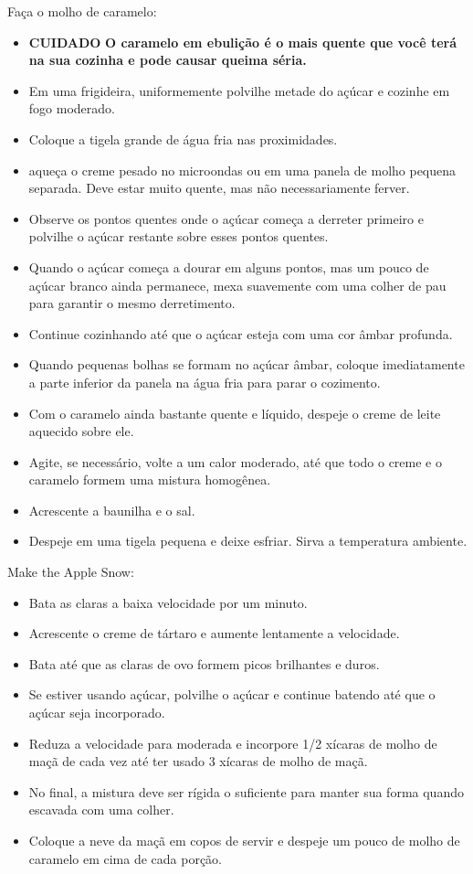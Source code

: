 \documentclass [11pt, letterpaper] {article}
\begin{document}
\begin {description}
\begin {description}
\item [Faça o molho de caramelo:] \ \\
\begin {itemize}
\item [{\bf CUIDADO}] {\bf O caramelo em ebulição é o mais quente que você terá na sua cozinha e pode causar queima séria.}
\item Em uma frigideira, uniformemente polvilhe metade do açúcar e cozinhe em fogo moderado.
\item Coloque a tigela grande de água fria nas proximidades.
\item aqueça o creme pesado no microondas ou em uma panela de molho pequena separada. Deve estar muito quente, mas não necessariamente ferver.
\item Observe os pontos quentes onde o açúcar começa a derreter primeiro e polvilhe o açúcar restante sobre esses pontos quentes.
\item Quando o açúcar começa a dourar em alguns pontos, mas um pouco de açúcar branco ainda permanece, mexa suavemente com uma colher de pau para garantir o mesmo derretimento.
\item Continue cozinhando até que o açúcar esteja com uma cor âmbar profunda.
\item Quando pequenas bolhas se formam no açúcar âmbar, coloque imediatamente a parte inferior da panela na água fria para parar o cozimento.
\item Com o caramelo ainda bastante quente e líquido, despeje o creme de leite aquecido sobre ele.
\item Agite, se necessário, volte a um calor moderado, até que todo o creme e o caramelo formem  uma mistura homogênea.
\item Acrescente a baunilha e o sal.
\item Despeje em uma tigela pequena e deixe esfriar. Sirva a temperatura ambiente.
\end {itemize}
\item [Make the Apple Snow:] \ \\
\begin {itemize}
\item Bata as claras a baixa velocidade por um minuto.
\item Acrescente o creme de tártaro e aumente lentamente a velocidade.
\item Bata até que as claras de ovo formem picos brilhantes e duros.
\item Se estiver usando açúcar, polvilhe o açúcar e continue batendo até que o açúcar seja incorporado.
\item Reduza a velocidade para moderada e incorpore 1/2 xícaras de molho de maçã de cada vez até ter usado 3 xícaras de molho de maçã.
\item No final, a mistura deve ser rígida o suficiente para manter sua forma quando escavada com uma colher.
\item Coloque a neve da maçã em copos de servir e despeje um pouco de molho de caramelo em cima de cada porção.
\end {itemize}
\end {description}
\end {description}
\end{document}
